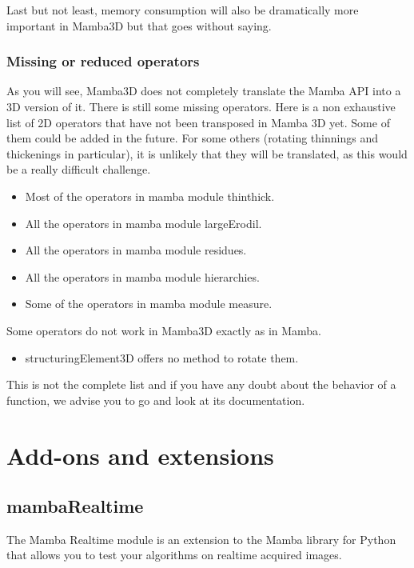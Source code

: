\documentclass[a4paper,10pt,oneside]{article}
\begin{document}
Last but not least, memory consumption will also be dramatically more important
in Mamba3D but that goes without saying.

\subsubsection{Missing or reduced operators}
\label{cha:missing3D}

As you will see, Mamba3D does not completely translate the Mamba API into
a 3D version of it. There is still some missing operators. Here is a non
exhaustive list of 2D operators that have not been transposed in Mamba 3D yet.
Some of them could be added in the future. For some others (rotating thinnings
and thickenings in particular), it is unlikely that they will be translated, as
this would be a really difficult challenge.

\begin{itemize}
\item Most of the operators in mamba module thinthick.
\item All the operators in mamba module largeErodil.
\item All the operators in mamba module residues.
\item All the operators in mamba module hierarchies.
\item Some of the operators in mamba module measure.
\end{itemize}

Some operators do not work in Mamba3D exactly as in Mamba.

\begin{itemize}
\item structuringElement3D offers no method to rotate them.
\end{itemize}

This is not the complete list and if you have any doubt about the behavior
of a function, we advise you to go and look at its documentation.

\pagebreak

\section{Add-ons and extensions}
\subsection{mambaRealtime}

The Mamba Realtime module is an extension to the Mamba library for Python that 
allows you to test your algorithms on realtime acquired images.
\end{document}

